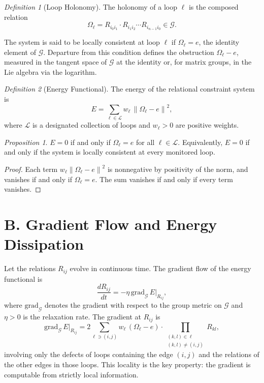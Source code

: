 \documentclass[12pt,a4paper,openany]{book}
\theoremstyle{plain}
\theoremstyle{definition}
\theoremstyle{remark}
\newtheorem*{proposition*}{Proposition}
\newtheorem*{definition*}{Definition}
\newcommand{\Energy}{E}
\newcommand{\norm}[1]{\left\|#1\right\|}
\begin{document}
\begin{definition*}[Loop Holonomy]
The holonomy of a loop $\ell$ is the composed relation
\[
\Omega_\ell = R_{i_0 i_1} \cdot R_{i_1 i_2} \cdots R_{i_{n-1} i_0} \in \mathcal{G}.
\]
\end{definition*}

The system is said to be locally consistent at loop $\ell$ if $\Omega_\ell = e$, the identity element of $\mathcal{G}$. Departure from this condition defines the obstruction $\Omega_\ell - e$, measured in the tangent space of $\mathcal{G}$ at the identity or, for matrix groups, in the Lie algebra via the logarithm.

\begin{definition*}[Energy Functional]
The energy of the relational constraint system is
\[
\Energy = \sum_{\ell \in \mathcal{L}} w_\ell \, \norm{\Omega_\ell - e}^2,
\]
where $\mathcal{L}$ is a designated collection of loops and $w_\ell > 0$ are positive weights.
\end{definition*}

\begin{proposition*}
$\Energy = 0$ if and only if $\Omega_\ell = e$ for all $\ell \in \mathcal{L}$. Equivalently, $\Energy = 0$ if and only if the system is locally consistent at every monitored loop.
\end{proposition*}

\begin{proof}
Each term $w_\ell \norm{\Omega_\ell - e}^2$ is nonnegative by positivity of the norm, and vanishes if and only if $\Omega_\ell = e$. The sum vanishes if and only if every term vanishes.
\end{proof}

\section*{B. Gradient Flow and Energy Dissipation}

Let the relations $R_{ij}$ evolve in continuous time. The gradient flow of the energy functional is
\[
\frac{d R_{ij}}{dt} = -\eta \, \mathrm{grad}_\mathcal{G} \, \Energy \big|_{R_{ij}},
\]
where $\mathrm{grad}_\mathcal{G}$ denotes the gradient with respect to the group metric on $\mathcal{G}$ and $\eta > 0$ is the relaxation rate. The gradient at $R_{ij}$ is
\[
\mathrm{grad}_\mathcal{G} \, \Energy \big|_{R_{ij}} = 2 \sum_{\ell \ni (i,j)} w_\ell \, (\Omega_\ell - e) \cdot \prod_{\substack{(k,l) \in \ell \\ (k,l) \neq (i,j)}} R_{kl},
\]
involving only the defects of loops containing the edge $(i, j)$ and the relations of the other edges in those loops. This locality is the key property: the gradient is computable from strictly local information.
\end{document}
